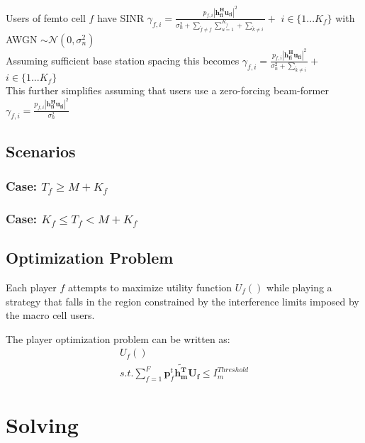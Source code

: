 \documentclass[12pt]{article}
\begin{document}
Users of femto cell $f$ have SINR $\gamma_{f,i} = \frac{p_{f,i}|\mathbf{h^H_{fi}u_{fi}}|^2}
{\sigma^2_{n}  + \sum_{\tilde{f}\neq f} \sum_{u=1}^{K_{\tilde{f}}} + \sum_{\tilde{k}\neq i}}+$   $i \in \{1 ... K_f\}$
with AWGN $\sim \mathcal{N}(0,\sigma^2_n)$
\\

Assuming sufficient base station spacing this becomes 
$\gamma_{f,i} = \frac{p_{f,i}|\mathbf{h^H_{fi}u_{fi}}|^2}
{\sigma^2_{n}  +  \sum_{\tilde{k}\neq i}}+$   $i \in \{1 ... K_f\}$
\\

This further simplifies assuming that users use a zero-forcing beam-former
$\gamma_{f,i} = \frac{p_{f,i}|\mathbf{h^H_{fi}u_{fi}}|^2}{\sigma^2_{n} }$
\\

\subsection{Scenarios}

\subsubsection{Case: $T_f \geq M + K_f$}

\subsubsection{Case: $K_f \leq T_f < M + K_f$}

\subsection{Optimization Problem}

Each player $f$ attempts to maximize utility function $U_f()$ while playing a strategy that falls in the region constrained by the interference limits imposed by the macro cell users.

The player optimization problem can be written as:
\\

\begin{gather*} 
U_f() 
\\
s.t. \sum^F_{f=1} \mathbf{p}_f^t \mathbf{\tilde{h_m^T}}  \mathbf{U_f}  \leq I^{Threshold}_{m} 
\end{gather*}


\section{Solving}
\end{document}
